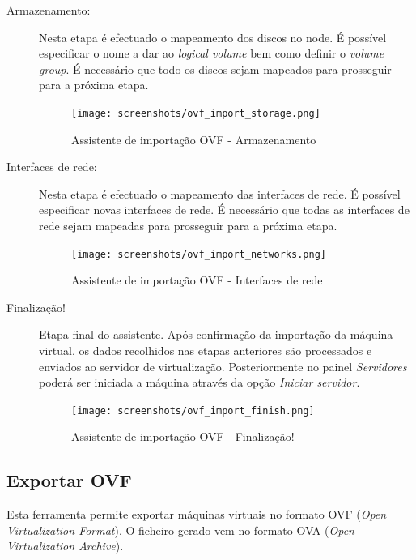\begin{description}
    \item[Armazenamento:] Nesta etapa é efectuado o mapeamento dos discos no node. É possível especificar o nome a dar ao \emph{logical volume} bem como definir o \emph{volume group}.
        É necessário que todo os discos sejam mapeados para prosseguir para a próxima etapa.
		\begin{figure}[H]
            \begin{center}
            \texttt{[image: screenshots/ovf\_import\_storage.png]}
            \caption{Assistente de importação OVF - Armazenamento}
            \label{fig:ovf_import_storage}
            \end{center}
        \end{figure}    

    \item[Interfaces de rede:] Nesta etapa é efectuado o mapeamento das interfaces de rede. É possível especificar novas interfaces de rede.
        É necessário que todas as interfaces de rede sejam mapeadas para prosseguir para a próxima etapa.
		\begin{figure}[H]
            \begin{center}
            \texttt{[image: screenshots/ovf\_import\_networks.png]}
            \caption{Assistente de importação OVF - Interfaces de rede}
            \label{fig:ovf_import_networks}
            \end{center}
        \end{figure}

    \item[Finalização!] Etapa final do assistente. Após confirmação da importação da máquina virtual, os dados recolhidos nas etapas anteriores são processados e enviados ao servidor de virtualização. Posteriormente no painel \emph{Servidores} poderá ser iniciada a máquina através da opção \emph{Iniciar servidor}.
		\begin{figure}[H]
			\begin{center}
			\texttt{[image: screenshots/ovf\_import\_finish.png]}
            \caption{Assistente de importação OVF - Finalização!}
			\label{fig:ovf_import_finish}
			\end{center}
		\end{figure}

\end{description}

\subsection{Exportar OVF}
Esta ferramenta permite exportar máquinas virtuais no formato OVF (\emph{Open Virtualization Format}).
O ficheiro gerado vem no formato OVA (\emph{Open Virtualization Archive}).

